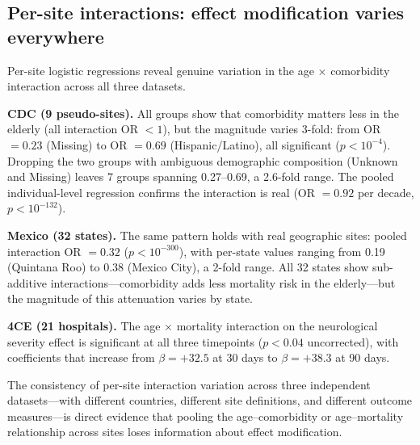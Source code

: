 \documentclass{article}
\begin{document}
\subsection{Per-site interactions: effect modification varies everywhere}

Per-site logistic regressions reveal genuine variation in the
age $\times$ comorbidity interaction across all three datasets.

\textbf{CDC (9 pseudo-sites).}  All groups show that comorbidity matters
less in the elderly (all interaction OR $< 1$), but the magnitude varies
3-fold: from OR $= 0.23$ (Missing) to OR $= 0.69$ (Hispanic/Latino), all
significant ($p < 10^{-4}$).  Dropping the two groups with ambiguous
demographic composition (Unknown and Missing) leaves 7 groups spanning
0.27--0.69, a 2.6-fold range.  The pooled individual-level regression
confirms the interaction is real (OR $= 0.92$ per decade,
$p < 10^{-132}$).

\textbf{Mexico (32 states).}  The same pattern holds with real geographic
sites: pooled interaction OR $= 0.32$ ($p < 10^{-300}$), with per-state
values ranging from 0.19 (Quintana Roo) to 0.38 (Mexico City), a 2-fold
range.  All 32 states show sub-additive interactions---comorbidity adds
less mortality risk in the elderly---but the magnitude of this attenuation
varies by state.

\textbf{4CE (21 hospitals).}  The age $\times$ mortality interaction on the
neurological severity effect is significant at all three timepoints
($p < 0.04$ uncorrected), with coefficients that increase from
$\beta = +32.5$ at 30 days to $\beta = +38.3$ at 90 days.

The consistency of per-site interaction variation across three independent
datasets---with different countries, different site definitions, and
different outcome measures---is direct evidence that pooling the
age--comorbidity or age--mortality relationship across sites loses
information about effect modification.
\end{document}
